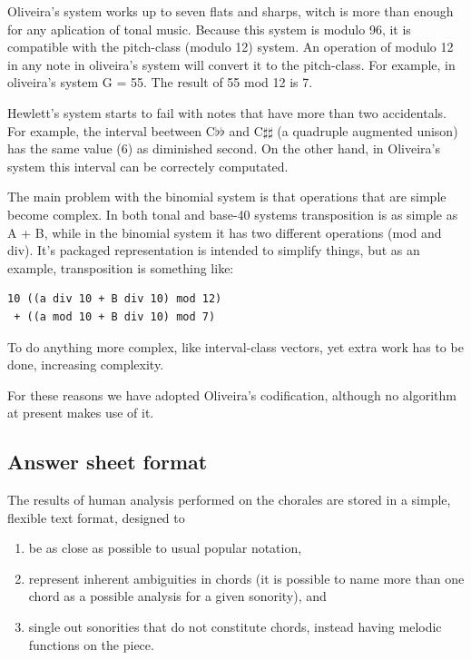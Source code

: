 \documentclass{article}
\begin{document}
Oliveira's system works up to seven flats and sharps, witch is more
than enough for any aplication of tonal music. Because this system is
modulo 96, it is compatible with the pitch-class (modulo 12) system.
An operation of modulo 12 in any note in oliveira's system will
convert it to the pitch-class. For example, in oliveira's system G =
55. The result of 55 mod 12 is 7.

Hewlett's system starts to fail with notes that have more than two
accidentals. For example, the interval beetween C$\flat\flat$ and
C$\sharp\sharp$ (a quadruple augmented unison) has the same value (6)
as diminished second. On the other hand, in Oliveira's system this
interval can be correctely computated.

The main problem with the binomial system is that operations that are
simple become complex. In both tonal and base-40 systems transposition
is as simple as A + B, while in the binomial system it has two
different operations (mod and div). It's packaged representation is
intended to simplify things, but as an example, transposition is
something like:

\begin{verbatim}
10 ((a div 10 + B div 10) mod 12)
 + ((a mod 10 + B div 10) mod 7)
\end{verbatim}

To do anything more complex, like interval-class vectors, yet extra
work has to be done, increasing complexity.

For these reasons we have adopted Oliveira's codification, although no
algorithm at present makes use of it.

\subsection{Answer sheet format}
\label{sec:formato-dos-acordes}

The results of human analysis performed on the chorales are stored in
a simple, flexible text format, designed to

\begin{enumerate}
\item be as close as possible to usual popular notation,
\item represent inherent ambiguities in chords (it is possible to name
  more than one chord as a possible analysis for a given sonority),
  and
\item single out sonorities that do not constitute chords, instead
  having melodic functions on the piece.
\end{enumerate}
\end{document}
